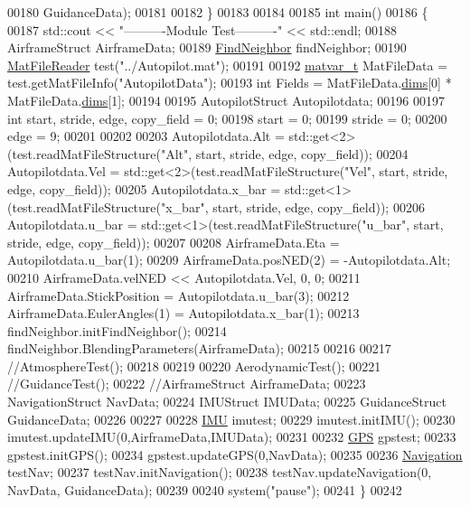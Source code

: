 \begin{DoxyCode}
00180                                 GuidanceData);
00181 
00182 \}
00183 
00184 
00185 \textcolor{keywordtype}{int} main()
00186 \{
00187     std::cout << \textcolor{stringliteral}{"----------Module Test----------"} << std::endl;
00188     AirframeStruct  AirframeData;
00189     \hyperlink{class_find_neighbor}{FindNeighbor} findNeighbor;
00190     \hyperlink{class_mat_file_reader}{MatFileReader} test(\textcolor{stringliteral}{"../Autopilot.mat"});
00191 
00192     \hyperlink{group___m_a_t_structmatvar__t}{matvar\_t} MatFileData = test.getMatFileInfo(\textcolor{stringliteral}{"AutopilotData"});
00193     \textcolor{keywordtype}{int} Fields = MatFileData.\hyperlink{group___m_a_t_a8e01234e1c862ce3472bb37f5a09b92c}{dims}[0] * MatFileData.\hyperlink{group___m_a_t_a8e01234e1c862ce3472bb37f5a09b92c}{dims}[1];
00194 
00195     AutopilotStruct Autopilotdata;
00196 
00197     \textcolor{keywordtype}{int} start, stride, edge, copy\_field = 0;
00198     start = 0;
00199     stride = 0;
00200     edge = 9;
00201 
00202 
00203     Autopilotdata.Alt = std::get<2>(test.readMatFileStructure(\textcolor{stringliteral}{"Alt"}, start, stride, edge, copy\_field));
00204     Autopilotdata.Vel = std::get<2>(test.readMatFileStructure(\textcolor{stringliteral}{"Vel"}, start, stride, edge, copy\_field));
00205     Autopilotdata.x\_bar = std::get<1>(test.readMatFileStructure(\textcolor{stringliteral}{"x\_bar"}, start, stride, edge, copy\_field));
00206     Autopilotdata.u\_bar = std::get<1>(test.readMatFileStructure(\textcolor{stringliteral}{"u\_bar"}, start, stride, edge, copy\_field));
00207 
00208     AirframeData.Eta = Autopilotdata.u\_bar(1);
00209     AirframeData.posNED(2) = -Autopilotdata.Alt;
00210     AirframeData.velNED << Autopilotdata.Vel, 0, 0;
00211     AirframeData.StickPosition = Autopilotdata.u\_bar(3);
00212     AirframeData.EulerAngles(1) = Autopilotdata.x\_bar(1);
00213     findNeighbor.initFindNeighbor();
00214     findNeighbor.BlendingParameters(AirframeData);
00215 
00216 
00217     \textcolor{comment}{//AtmosphereTest();}
00218 
00219 
00220     AerodynamicTest();
00221     \textcolor{comment}{//GuidanceTest();}
00222     \textcolor{comment}{//AirframeStruct AirframeData;}
00223     NavigationStruct NavData;
00224     IMUStruct IMUData;
00225     GuidanceStruct GuidanceData;
00226 
00227 
00228     \hyperlink{class_i_m_u}{IMU} imutest;
00229     imutest.initIMU();
00230     imutest.updateIMU(0,AirframeData,IMUData);
00231 
00232     \hyperlink{class_g_p_s}{GPS} gpstest;
00233     gpstest.initGPS();
00234     gpstest.updateGPS(0,NavData);
00235     
00236     \hyperlink{class_navigation}{Navigation} testNav;
00237     testNav.initNavigation();
00238     testNav.updateNavigation(0, NavData, GuidanceData);
00239 
00240     system(\textcolor{stringliteral}{"pause"});
00241 \}
00242 
\end{DoxyCode}
